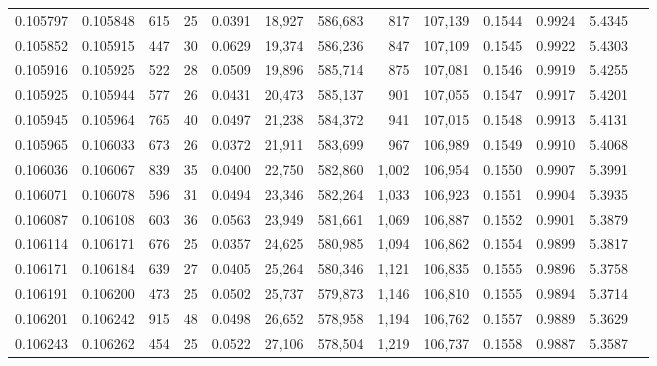 \begin{tabular}{rrrrrrrrrrrrr}
0.105797 & 0.105848 &   615 &  25 &                                     0.0391 &  18,927 & 586,683 &     817 & 107,139 & 0.1544 & 0.9924 & 5.4345 \\
0.105852 & 0.105915 &   447 &  30 &                                     0.0629 &  19,374 & 586,236 &     847 & 107,109 & 0.1545 & 0.9922 & 5.4303 \\
0.105916 & 0.105925 &   522 &  28 &                                     0.0509 &  19,896 & 585,714 &     875 & 107,081 & 0.1546 & 0.9919 & 5.4255 \\
0.105925 & 0.105944 &   577 &  26 &                                     0.0431 &  20,473 & 585,137 &     901 & 107,055 & 0.1547 & 0.9917 & 5.4201 \\
0.105945 & 0.105964 &   765 &  40 &                                     0.0497 &  21,238 & 584,372 &     941 & 107,015 & 0.1548 & 0.9913 & 5.4131 \\
0.105965 & 0.106033 &   673 &  26 &                                     0.0372 &  21,911 & 583,699 &     967 & 106,989 & 0.1549 & 0.9910 & 5.4068 \\
0.106036 & 0.106067 &   839 &  35 &                                     0.0400 &  22,750 & 582,860 &   1,002 & 106,954 & 0.1550 & 0.9907 & 5.3991 \\
0.106071 & 0.106078 &   596 &  31 &                                     0.0494 &  23,346 & 582,264 &   1,033 & 106,923 & 0.1551 & 0.9904 & 5.3935 \\
0.106087 & 0.106108 &   603 &  36 &                                     0.0563 &  23,949 & 581,661 &   1,069 & 106,887 & 0.1552 & 0.9901 & 5.3879 \\
0.106114 & 0.106171 &   676 &  25 &                                     0.0357 &  24,625 & 580,985 &   1,094 & 106,862 & 0.1554 & 0.9899 & 5.3817 \\
0.106171 & 0.106184 &   639 &  27 &                                     0.0405 &  25,264 & 580,346 &   1,121 & 106,835 & 0.1555 & 0.9896 & 5.3758 \\
0.106191 & 0.106200 &   473 &  25 &                                     0.0502 &  25,737 & 579,873 &   1,146 & 106,810 & 0.1555 & 0.9894 & 5.3714 \\
0.106201 & 0.106242 &   915 &  48 &                                     0.0498 &  26,652 & 578,958 &   1,194 & 106,762 & 0.1557 & 0.9889 & 5.3629 \\
0.106243 & 0.106262 &   454 &  25 &                                     0.0522 &  27,106 & 578,504 &   1,219 & 106,737 & 0.1558 & 0.9887 & 5.3587 \\

\end{tabular}
